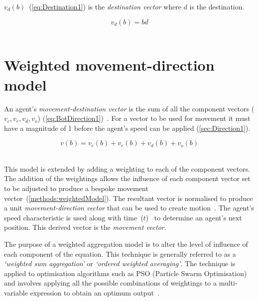 
$v_d(b)$~(\autoref{eq:Destination1}) is the \textit{destination vector} where $d$ is the destination. 

\begin{center}
\begin{equation}\label{eq:Destination1}‎
v_{d}(b) =‎ bd
\end{equation}‎
\end{center}

\section{Weighted movement-direction model}\label{methods:weightedModel}
An agent's \textit{movement-destination vector} is the sum of all the component vectors ($v_c, v_r, v_d, v_o$) (\autoref{eq:BotDirection1})~\cite{HAY:08}. For a vector to be used for movement it must have a magnitude of 1 before the agent's speed can be applied (\autoref{sec:Direction1}).

 
\begin{center}
\begin{equation}
\label{eq:BotDirection1}
v(b) =‎ v_{c}(b) + v_{r}(b) + v_{d}(b) + v_{o}(b)
\end{equation}‎
\end{center}


This model is extended by adding a weighting to each of the component vectors. The addition of the weightings allows the influence of each component vector set to be adjusted to produce a bespoke movement vector~(\autoref{methods:weightedModel}). The resultant vector is normalised to produce a unit \textit{movement-direction vector} that can be used to create motion~\cite{KC:08}. The agent's speed characteristic is used along with time~($t$)~\cite{FAP:05, GP:05} to determine an agent's next position. This derived vector is the \textit{movement vector}.

The purpose of a weighted aggregation model is to alter the level of influence of each component of the equation. This technique is generally referred to as a \textit{`weighted sum aggregation'} or \textit{`ordered weighted averaging'}. The technique is applied to optimisation algorithms such as PSO (Particle Swarm Optimisation) and involves applying all the possible combinations of weightings to a multi-variable expression to obtain an optimum output~\cite{MV:12, XTH:09}.

